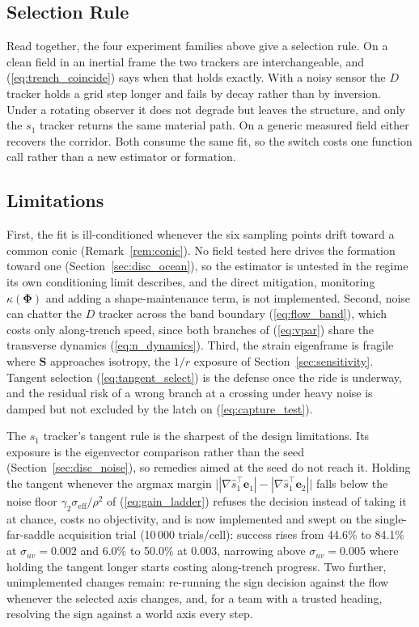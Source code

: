 \documentclass[lettersize,journal]{IEEEtran}
\begin{document}
\subsection{Selection Rule}
\label{sec:selection_rule}

Read together, the four experiment families above give a selection rule.
On a clean field in an inertial frame the two trackers are
interchangeable, and (\ref{eq:trench_coincide}) says when that holds
exactly. With a noisy sensor the $D$ tracker holds a grid step longer and
fails by decay rather than by inversion. Under a rotating observer
it does not degrade but leaves the structure, and only the $s_1$ tracker
returns the same material path. On a generic measured field either
recovers the corridor. Both consume the same fit, so the switch costs one
function call rather than a new estimator or formation.

\subsection{Limitations}
\label{sec:limitations}

First, the fit is ill-conditioned whenever the six sampling
points drift toward a common conic (Remark~\ref{rem:conic}). No field
tested here drives the formation toward one
(Section~\ref{sec:disc_ocean}), so the estimator is untested in the
regime its own conditioning limit describes, and the direct mitigation,
monitoring $\kappa(\boldsymbol{\Phi})$ and adding a shape-maintenance
term, is not implemented.
Second, noise can chatter the $D$ tracker across the band boundary
(\ref{eq:flow_band}), which costs only along-trench speed, since both
branches of (\ref{eq:vpar}) share the transverse dynamics
(\ref{eq:n_dynamics}). Third, the strain eigenframe is fragile where
$\mathbf{S}$ approaches isotropy, the $1/r$ exposure of
Section~\ref{sec:sensitivity}. Tangent selection (\ref{eq:tangent_select})
is the defense once the ride is underway, and the residual risk of a
wrong branch at a crossing under heavy noise is damped but not excluded
by the latch on (\ref{eq:capture_test}).

The $s_1$ tracker's tangent rule is the sharpest of the design
limitations. Its exposure is the eigenvector comparison rather than the
seed (Section~\ref{sec:disc_noise}), so remedies aimed at the seed do
not reach it. Holding the tangent whenever the argmax margin
$\bigl||\nabla\hat{s}_1^\top\mathbf{e}_1| -
|\nabla\hat{s}_1^\top\mathbf{e}_2|\bigr|$ falls below the noise floor
$\gamma_2\sigma_{\mathrm{eff}}/\rho^2$ of (\ref{eq:gain_ladder}) refuses
the decision instead of taking it at chance, costs no objectivity, and
is now implemented and swept on
the single-far-saddle acquisition trial (10\,000 trials/cell): success
rises from 44.6\% to 84.1\% at $\sigma_{uv} = 0.002$ and 6.0\% to
50.0\% at 0.003, narrowing above $\sigma_{uv} = 0.005$ where holding the
tangent longer starts costing along-trench progress. Two further,
unimplemented changes remain: re-running the sign decision against the
flow whenever the selected axis changes, and, for a team with a trusted
heading, resolving the sign against a world axis every step.
\end{document}
